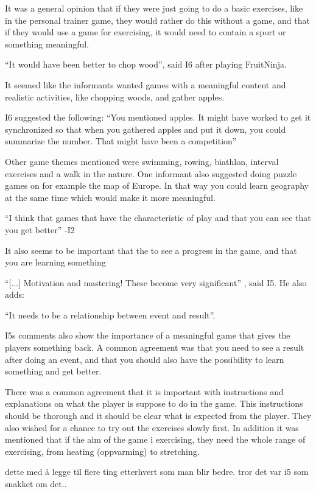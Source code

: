 It was a general opinion that if they were just going to do a basic exercises, like in the personal trainer game, they would rather do this without a game, and that if they would use a game for exercising, it would need to contain a sport or something meaningful. 

“It would have been better to chop wood”, said I6 after playing FruitNinja. 

It seemed like the informants wanted games with a meaningful content and realistic activities, like chopping woods, and gather apples. 

I6 suggested the following: “You mentioned apples. It might have worked to get it synchronized so that when you gathered apples and put it down, you could summarize the number. That might have been a competition” 

Other game themes mentioned were swimming, rowing, biathlon, interval exercises and a walk in the nature. One informant also suggested doing puzzle games on for example the map of Europe. In that way you could learn geography at the same time which would make it more meaningful.

“I think that games that have the characteristic of play and that you can see that you get better” -I2

It also seems to be important that the to see a progress in the game, and that you are learning something 

“[...] Motivation and mastering! These become very significant” , said I5. He also adds:

“It needs to be a relationship between event and result”.

I5s comments also show the importance of a meaningful game that gives the players something back. A common agreement was that you need to see a result after doing an event, and that you should also have the possibility to learn something and get better. 

There was a common agreement that it is important with instructions and explanations on what the player is suppose to do in the game. This instructions should be thorough and it should be clear what is expected from the player. They also wished for a chance to try out the exercises slowly first. In addition it was mentioned that if the aim of the game i exercising, they need the whole range of exercising, from heating (oppvarming) to stretching. 

dette med å legge til flere ting etterhvert som man blir bedre. tror det var i5 som snakket om det..

